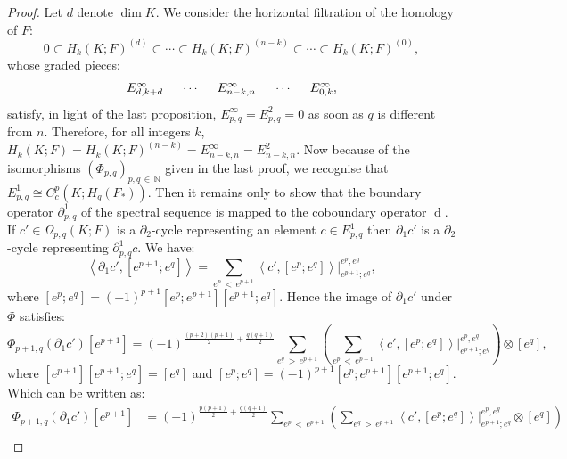 \documentclass[AHL,Unicode,longabstracts,published]{cedram}
\newcommand{\N}{\mathbb{N}}
\DeclareMathOperator{\df}{d}
\begin{document}
\begin{proof}
Let $d$ denote $\dim K$. We consider the horizontal filtration of the homology of $F$:
\begin{equation*}
0\subset H_k(K;F)^{(d)} \subset \cdots \subset H_k(K;F)^{(n-k)} \subset \cdots \subset H_k(K;F)^{(0)},
\end{equation*}
whose graded pieces:
\begin{equation*}
E^\infty_{d,k+d} \hspace{0.5cm} \cdots \hspace{0.5cm} E^\infty_{n-k,n} \hspace{0.5cm} \cdots \hspace{0.5cm} E^\infty_{0,k},
\end{equation*}
satisfy, in light of the last proposition, $E^\infty_{p,q}=E^2_{p,q}=0$ as soon as $q$ is different from $n$. Therefore, for all integers $k$, $H_k(K;F)=H_k(K;F)^{(n-k)}=E^\infty_{n-k,n}=E^2_{n-k,n}$. Now because of the isomorphisms $(\Phi_{p,q})_{p,q\,\in\,\N}$ given in the last proof, we recognise that $E^1_{p,q}\cong C^p_c(K;H_q(F_*))$. Then it remains only to show that the boundary operator $\partial^1_{p,q}$ of the spectral sequence is mapped to the coboundary operator $\df$. If $c'\in\Omega_{p,q}(K;F)$ is a $\partial_2$-cycle representing an element $c\in E^1_{p,q}$ then $\partial_1 c'$ is a $\partial_2$-cycle representing $\partial^1_{p,q} c$. We have:
\begin{equation*}
\left\langle \partial_1 c',[e^{p+1};e^q]\right\rangle = \sum_{e^p\,<\,e^{p+1}} \left\langle c',[e^{p};e^q]\right\rangle \Big|^{e^p,e^q}_{e^{p+1};e^q},
\end{equation*}
where $[e^{p};e^q]=(-1)^{p+1}[e^p;e^{p+1}][e^{p+1};e^q]$. Hence the image of $\partial_1 c'$ under $\Phi$ satisfies:
\begin{equation*}
\Phi_{p+1,q}(\partial_1 c')\left[e^{p+1}\right]=(-1)^{\frac{(p+2)(p+1)}{2}+\frac{q(q+1)}{2}} \sum_{e^q\,>\,e^{p+1}}\left(\sum_{e^p\,<\,e^{p+1}} \left\langle c',[e^{p};e^q]\right\rangle \Big|^{e^p,e^q}_{e^{p+1};e^q} \right)\otimes[e^q],
\end{equation*}
where $[e^{p+1}][e^{p+1};e^q]=[e^q]$ and $[e^{p};e^q]=(-1)^{p+1}[e^p;e^{p+1}][e^{p+1};e^q]$. Which can be written as:
\begin{equation*}
\begin{split}
\Phi_{p+1,q}(\partial_1 c')\left[e^{p+1}\right] & =(-1)^{\frac{p(p+1)}{2}+\frac{q(q+1)}{2}}\sum_{e^p\,<\,e^{p+1}}\left(\sum_{e^q\,>\,e^{p+1}} \left\langle c',[e^{p};e^q]\right\rangle \Big|^{e^p,e^q}_{e^{p+1};e^q} \otimes[e^q]\right) \\

\end{split}
\end{equation*}
\end{proof}
\end{document}
